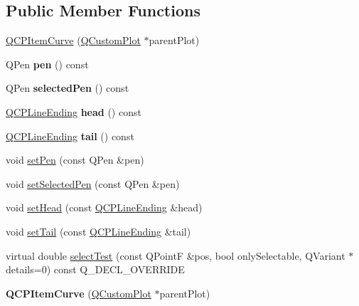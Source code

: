 \subsection*{Public Member Functions}
\begin{DoxyCompactItemize}
\item 
\hyperlink{class_q_c_p_item_curve_ac9b7508bb5c8827e1a7a6199f8c82bec}{Q\+C\+P\+Item\+Curve} (\hyperlink{class_q_custom_plot}{Q\+Custom\+Plot} $\ast$parent\+Plot)
\item 
Q\+Pen {\bfseries pen} () const \hypertarget{class_q_c_p_item_curve_abc6321e55a9ba1a0c7df407843dfa252}{}\label{class_q_c_p_item_curve_abc6321e55a9ba1a0c7df407843dfa252}

\item 
Q\+Pen {\bfseries selected\+Pen} () const \hypertarget{class_q_c_p_item_curve_abd8b8be5b13bc4dafec4c1758c281336}{}\label{class_q_c_p_item_curve_abd8b8be5b13bc4dafec4c1758c281336}

\item 
\hyperlink{class_q_c_p_line_ending}{Q\+C\+P\+Line\+Ending} {\bfseries head} () const \hypertarget{class_q_c_p_item_curve_afc067f0d1e60cd04812f2c2c7fdf36c3}{}\label{class_q_c_p_item_curve_afc067f0d1e60cd04812f2c2c7fdf36c3}

\item 
\hyperlink{class_q_c_p_line_ending}{Q\+C\+P\+Line\+Ending} {\bfseries tail} () const \hypertarget{class_q_c_p_item_curve_a9adddfcc5275be0cf27e3c0c31c37c1a}{}\label{class_q_c_p_item_curve_a9adddfcc5275be0cf27e3c0c31c37c1a}

\item 
void \hyperlink{class_q_c_p_item_curve_a034be908440aec785c34b92843461221}{set\+Pen} (const Q\+Pen \&pen)
\item 
void \hyperlink{class_q_c_p_item_curve_a375b917669f868c5a106bf2f1ab7c26d}{set\+Selected\+Pen} (const Q\+Pen \&pen)
\item 
void \hyperlink{class_q_c_p_item_curve_a08a30d9cdd63995deea3d9e20430676f}{set\+Head} (const \hyperlink{class_q_c_p_line_ending}{Q\+C\+P\+Line\+Ending} \&head)
\item 
void \hyperlink{class_q_c_p_item_curve_ac3488d8b1a6489c845dc5bff3ef71124}{set\+Tail} (const \hyperlink{class_q_c_p_line_ending}{Q\+C\+P\+Line\+Ending} \&tail)
\item 
virtual double \hyperlink{class_q_c_p_item_curve_a718fa40140a43c8afbd41a3d85c92d72}{select\+Test} (const Q\+PointF \&pos, bool only\+Selectable, Q\+Variant $\ast$details=0) const Q\+\_\+\+D\+E\+C\+L\+\_\+\+O\+V\+E\+R\+R\+I\+DE
\item 
{\bfseries Q\+C\+P\+Item\+Curve} (\hyperlink{class_q_custom_plot}{Q\+Custom\+Plot} $\ast$parent\+Plot)\hypertarget{class_q_c_p_item_curve_ac9b7508bb5c8827e1a7a6199f8c82bec}{}\label{class_q_c_p_item_curve_ac9b7508bb5c8827e1a7a6199f8c82bec}


\end{DoxyCompactItemize}
